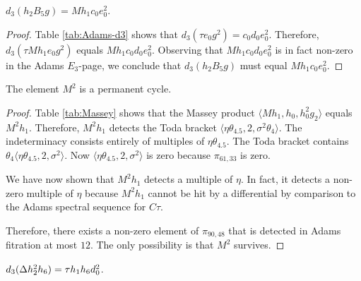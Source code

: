 \begin{lemma}
\label{lem:d3-h2B5g}
$d_3(h_2 B_5 g) = M h_1 c_0 e_0^2$.
\end{lemma}

\begin{proof}

Table \ref{tab:Adams-d3} shows that $d_3(\tau e_0 g^2) = c_0 d_0 e_0^2$.
Therefore, $d_3(\tau M h_1 e_0 g^2)$ equals
$M h_1 c_0 d_0 e_0^2$.  Observing
that $M h_1 c_0 d_0 e_0^2$ is in fact non-zero in the Adams $E_3$-page,
we conclude that $d_3(h_2 B_5 g)$ must equal $M h_1 c_0 e_0^2$.
\end{proof}

\begin{lemma}
\label{lem:perm-M^2}
The element $M^2$ is a permanent cycle.
\end{lemma}

\begin{proof}
Table \ref{tab:Massey} shows that the Massey product 
$\langle M h_1, h_0, h_0^2 g_2 \rangle$ equals $M^2 h_1$.
Therefore,
$M^2 h_1$ detects the Toda bracket
$\langle \eta \theta_{4.5}, 2, \sigma^2 \theta_4 \rangle$.
The indeterminacy consists entirely
of multiples of $\eta \theta_{4.5}$.
The Toda bracket contains
$\theta_4 \langle \eta \theta_{4.5}, 2, \sigma^2 \rangle$.
Now 
$\langle \eta \theta_{4.5}, 2, \sigma^2 \rangle$ is zero because
$\pi_{61,33}$ is zero.

We have now shown that $M^2 h_1$ detects a multiple
of $\eta$.  In fact, it detects a non-zero multiple of $\eta$
because $M^2 h_1$ cannot be hit by a differential by 
comparison to the Adams spectral sequence for $C\tau$.

Therefore, there exists a non-zero element of $\pi_{90,48}$
that is detected in Adams fitration at most $12$.
The only possibility is that $M^2$ survives.
\end{proof}

\begin{lemma}
\label{lem:d3-Dh2^2h6}
$d_3(\Delta h_2^2 h_6) = \tau h_1 h_6 d_0^2$.
\end{lemma}

